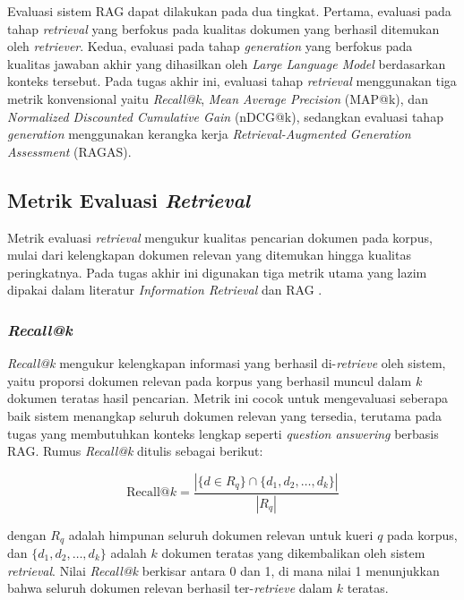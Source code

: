 Evaluasi sistem RAG dapat dilakukan pada dua tingkat. Pertama, evaluasi pada tahap \textit{retrieval} yang berfokus pada kualitas dokumen yang berhasil ditemukan oleh \textit{retriever}. Kedua, evaluasi pada tahap \textit{generation} yang berfokus pada kualitas jawaban akhir yang dihasilkan oleh \textit{Large Language Model} berdasarkan konteks tersebut. Pada tugas akhir ini, evaluasi tahap \textit{retrieval} menggunakan tiga metrik konvensional yaitu \textit{Recall@k}, \textit{Mean Average Precision} (MAP@k), dan \textit{Normalized Discounted Cumulative Gain} (nDCG@k), sedangkan evaluasi tahap \textit{generation} menggunakan kerangka kerja \textit{Retrieval-Augmented Generation Assessment} (RAGAS).

\subsection{Metrik Evaluasi \textit{Retrieval}}
\label{subsec:metrik-retrieval}

Metrik evaluasi \textit{retrieval} mengukur kualitas pencarian dokumen pada korpus, mulai dari kelengkapan dokumen relevan yang ditemukan hingga kualitas peringkatnya. Pada tugas akhir ini digunakan tiga metrik utama yang lazim dipakai dalam literatur \textit{Information Retrieval} dan RAG \parencite{ma2023queryrewriting, cormack2009reciprocal, lewis2020retrieval}.

\subsubsection{\textit{Recall@k}}

\textit{Recall@k} mengukur kelengkapan informasi yang berhasil di-\textit{retrieve} oleh sistem, yaitu proporsi dokumen relevan pada korpus yang berhasil muncul dalam $k$ dokumen teratas hasil pencarian. Metrik ini cocok untuk mengevaluasi seberapa baik sistem menangkap seluruh dokumen relevan yang tersedia, terutama pada tugas yang membutuhkan konteks lengkap seperti \textit{question answering} berbasis RAG. Rumus \textit{Recall@k} ditulis sebagai berikut:

\begin{equation}
\text{Recall@}k = \frac{|\{d \in R_q\} \cap \{d_1, d_2, \dots, d_k\}|}{|R_q|}
\end{equation}

dengan $R_q$ adalah himpunan seluruh dokumen relevan untuk kueri $q$ pada korpus, dan $\{d_1, d_2, \dots, d_k\}$ adalah $k$ dokumen teratas yang dikembalikan oleh sistem \textit{retrieval}. Nilai \textit{Recall@k} berkisar antara 0 dan 1, di mana nilai 1 menunjukkan bahwa seluruh dokumen relevan berhasil ter-\textit{retrieve} dalam $k$ teratas.

